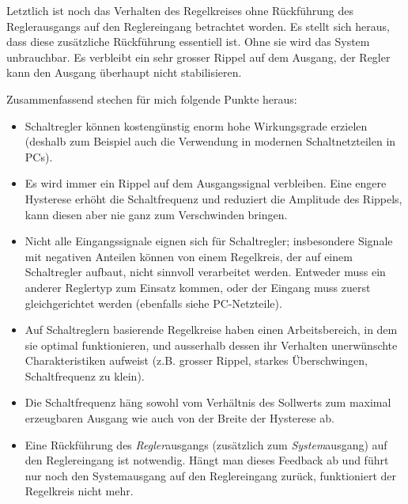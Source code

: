 \documentclass[a4paper,10pt]{article}
\begin{document}
Letztlich ist  noch das  Verhalten des  Regelkreises ohne  R\"uckf\"uhrung des
Reglerausgangs auf den Reglereingang betrachtet worden. Es stellt sich heraus,
dass  diese zus\"atzliche  R\"uckf\"uhrung essentiell  ist. Ohne sie  wird das
System unbrauchbar. Es verbleibt ein sehr  grosser Rippel auf dem Ausgang, der
Regler kann den Ausgang \"uberhaupt nicht stabilisieren.

\vspace{1em}

Zusammenfassend stechen f\"ur mich folgende Punkte heraus:
\begin{itemize}
    \item
        Schaltregler  k\"onnen   kosteng\"unstig  enorm   hohe   Wirkungsgrade
        erzielen  (deshalb  zum  Beispiel  auch  die  Verwendung  in  modernen
        Schaltnetzteilen in PCs).
    \item
        Es  wird  immer ein  Rippel  auf  dem Ausgangssignal  verbleiben. Eine
        engere  Hysterese  erh\"oht  die   Schaltfrequenz  und  reduziert  die
        Amplitude  des Rippels,  kann diesen  aber nie  ganz zum  Verschwinden
        bringen.
    \item
        Nicht   alle   Eingangssignale   eignen   sich   f\"ur   Schaltregler;
        insbesondere  Signale  mit  negativen   Anteilen  k\"onnen  von  einem
        Regelkreis,  der  auf  einem   Schaltregler  aufbaut,  nicht  sinnvoll
        verarbeitet werden. Entweder  muss ein  anderer Reglertyp  zum Einsatz
        kommen, oder der Eingang muss zuerst gleichgerichtet werden (ebenfalls
        siehe PC-Netzteile).
    \item
        Auf Schaltreglern  basierende Regelkreise haben  einen Arbeitsbereich,
        in dem sie optimal funktionieren,  und ausserhalb dessen ihr Verhalten
        unerw\"unschte Charakteristiken aufweist (z.B. grosser Rippel, starkes
        \"Uberschwingen, Schaltfrequenz zu klein).
    \item
        Die Schaltfrequenz  h\"ang sowohl  vom Verh\"altnis des  Sollwerts zum
        maximal erzeugbaren Ausgang wie auch von der Breite der Hysterese ab.
    \item
        Eine  R\"uckf\"uhrung  des   \emph{Regler}ausgangs  (zus\"atzlich  zum
        \emph{System}ausgang) auf den Reglereingang ist notwendig. H\"angt man
        dieses  Feedback ab  und f\"uhrt  nur noch  den Systemausgang  auf den
        Reglereingang zur\"uck, funktioniert der Regelkreis nicht mehr.
\end{itemize}
\end{document}
